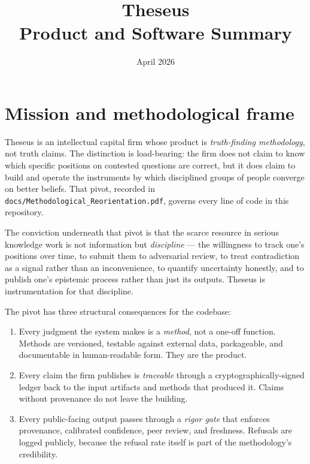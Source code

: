 \documentclass[11pt,letterpaper]{article}
\title{\textbf{Theseus}\\[4pt]\large Product and Software Summary}
\date{April 2026}
\author{}
\newcommand{\file}[1]{\texttt{#1}}
\begin{document}
\maketitle
\thispagestyle{empty}

\tableofcontents
\newpage

\section{Mission and methodological frame}

Theseus is an intellectual capital firm whose product is \emph{truth-finding methodology}, not truth claims. The distinction is load-bearing: the firm does not claim to know which specific positions on contested questions are correct, but it does claim to build and operate the instruments by which disciplined groups of people converge on better beliefs. That pivot, recorded in \file{docs/Methodological\_Reorientation.pdf}, governs every line of code in this repository.

The conviction underneath that pivot is that the scarce resource in serious knowledge work is not information but \emph{discipline} --- the willingness to track one's positions over time, to submit them to adversarial review, to treat contradiction as a signal rather than an inconvenience, to quantify uncertainty honestly, and to publish one's epistemic process rather than just its outputs. Theseus is instrumentation for that discipline.

The pivot has three structural consequences for the codebase:
\begin{enumerate}[leftmargin=1.5em,itemsep=0.2em]
  \item Every judgment the system makes is a \emph{method}, not a one-off function. Methods are versioned, testable against external data, packageable, and documentable in human-readable form. They are the product.
  \item Every claim the firm publishes is \emph{traceable} through a cryptographically-signed ledger back to the input artifacts and methods that produced it. Claims without provenance do not leave the building.
  \item Every public-facing output passes through a \emph{rigor gate} that enforces provenance, calibrated confidence, peer review, and freshness. Refusals are logged publicly, because the refusal rate itself is part of the methodology's credibility.
\end{enumerate}
\end{document}
